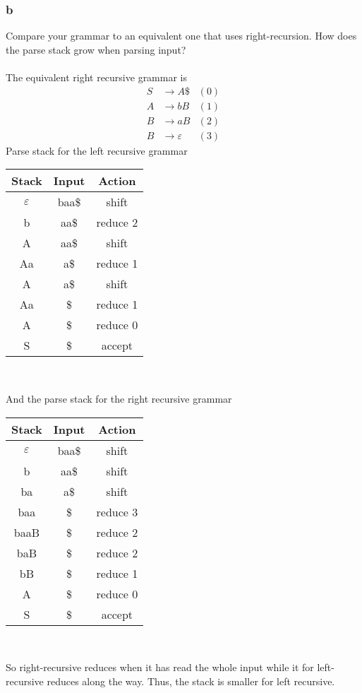 \documentclass[12pt]{article}
\begin{document}
\subsubsection*{b}
Compare your grammar to an equivalent one that uses right-recursion. How does the parse stack grow when parsing input?\\
\\
The equivalent right recursive grammar is
\begin{align*}
S&\rightarrow A\$ &(0) \\
A&\rightarrow bB &(1)\\
B&\rightarrow aB &(2)\\
B&\rightarrow \varepsilon&(3)
\end{align*}
\newpage
$ $\\
Parse stack for the left recursive grammar
\begin{center}
\begin{tabular}{|c|c|c|}
\hline
Stack & Input & Action \\ 
\hline 
$\varepsilon$ & baa\$ & shift \\ 
\hline 
b & aa\$ & reduce 2 \\ 
\hline 
A & aa\$ & shift \\ 
\hline 
Aa & a\$ & reduce 1 \\ 
\hline 
A & a\$ & shift \\ 
\hline
Aa & \$ & reduce 1 \\
\hline
A & \$ & reduce 0 \\
\hline
S & \$ & accept \\
\hline
\end{tabular}\\
\end{center}
And the parse stack for the right recursive grammar
\begin{center}
\begin{tabular}{|c|c|c|}
\hline 
Stack & Input & Action \\ 
\hline 
$\varepsilon$ & baa\$ & shift \\ 
\hline 
b & aa\$ & shift \\ 
\hline 
ba & a\$ & shift \\ 
\hline 
baa & \$ & reduce 3 \\ 
\hline 
baaB & \$ & reduce 2 \\ 
\hline
baB & \$ & reduce 2 \\
\hline
bB & \$ & reduce 1 \\
\hline
A & \$ & reduce 0 \\
\hline
S & \$ & accept \\
\hline
\end{tabular}\\
\end{center}
So right-recursive reduces when it has read the whole input while it for left-recursive reduces along the way. Thus, the stack is smaller for left recursive.
\end{document}
